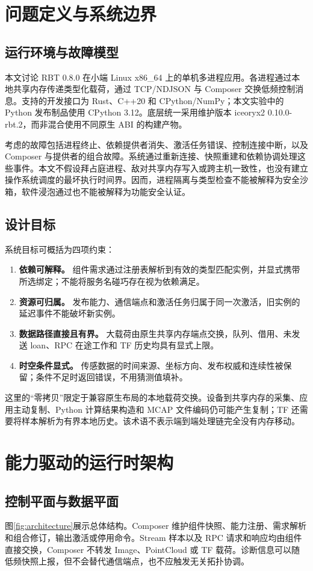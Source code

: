 \documentclass[UTF8,fontset=none,zihao=-4,a4paper]{ctexart}
\begin{document}
\section{问题定义与系统边界}
\subsection{运行环境与故障模型}
本文讨论 RBT 0.8.0 在小端 Linux x86\_64 上的单机多进程应用。各进程通过本地共享内存传递类型化载荷，通过 TCP/NDJSON 与 Composer 交换低频控制消息。支持的开发接口为 Rust、C++20 和 CPython/NumPy；本文实验中的 Python 发布制品使用 CPython 3.12。底层统一采用维护版本 iceoryx2 0.10.0-rbt.2，而非混合使用不同原生 ABI 的构建产物\cite{rbtcompat,rbtnative}。

考虑的故障包括进程终止、依赖提供者消失、激活任务错误、控制连接中断，以及 Composer 与提供者的组合故障。系统通过重新连接、快照重建和依赖协调处理这些事件。本文不假设拜占庭进程、敌对共享内存写入或跨主机一致性，也没有建立操作系统调度的最坏执行时间界。因而，进程隔离与类型检查不能被解释为安全沙箱，软件浸泡通过也不能被解释为功能安全认证。

\subsection{设计目标}
系统目标可概括为四项约束：
\begin{enumerate}
  \item \textbf{依赖可解释。} 组件需求通过注册表解析到有效的类型匹配实例，并显式携带所选绑定；不能将服务名碰巧存在视为依赖满足。
  \item \textbf{资源可归属。} 发布能力、通信端点和激活任务归属于同一次激活，旧实例的延迟事件不能破坏新实例。
  \item \textbf{数据路径直接且有界。} 大载荷由原生共享内存端点交换，队列、借用、未发送 loan、RPC 在途工作和 TF 历史均具有显式上限。
  \item \textbf{时空条件显式。} 传感数据的时间来源、坐标方向、发布权威和连续性被保留；条件不足时返回错误，不用猜测值填补。
\end{enumerate}
这里的“零拷贝”限定于兼容原生布局的本地载荷交换。设备到共享内存的采集、应用主动复制、Python 计算结果构造和 MCAP 文件编码仍可能产生复制；TF 还需要将样本解析为有界本地历史。该术语不表示端到端处理链完全没有内存移动。

\section{能力驱动的运行时架构}
\subsection{控制平面与数据平面}
图\ref{fig:architecture}展示总体结构。Composer 维护组件快照、能力注册、需求解析和组合修订，输出激活或停用命令。Stream 样本以及 RPC 请求和响应均由组件直接交换，Composer 不转发 Image、PointCloud 或 TF 载荷。诊断信息可以随低频快照上报，但不会替代通信端点，也不应触发无关拓扑协调\cite{rbtarch}。
\end{document}
